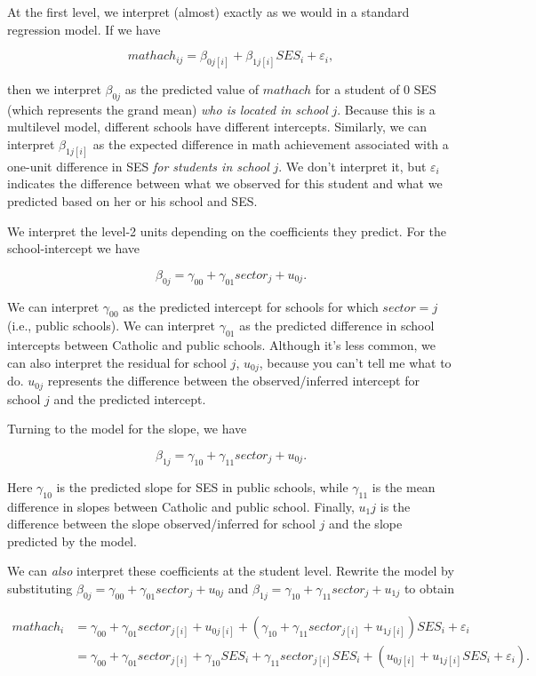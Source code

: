 \documentclass[
  letterpaper,
  DIV=11,
  numbers=noendperiod]{scrreprt}
\begin{document}
At the first level, we interpret (almost) exactly as we would in a
standard regression model. If we have

\[mathach_{ij} = \beta_{0j[i]} + \beta_{1j[i]}SES_i + \varepsilon_i,\]

then we interpret \(\beta_{0j}\) as the predicted value of \(mathach\)
for a student of 0 SES (which represents the grand mean) \emph{who is
located in school} \(j\). Because this is a multilevel model, different
schools have different intercepts. Similarly, we can interpret
\(\beta_{1j[i]}\) as the expected difference in math achievement
associated with a one-unit difference in SES \emph{for students in
school} \(j\). We don't interpret it, but \(\varepsilon_i\) indicates
the difference between what we observed for this student and what we
predicted based on her or his school and SES.

We interpret the level-2 units depending on the coefficients they
predict. For the school-intercept we have

\[\beta_{0j} = \gamma_{00} + \gamma_{01}sector_j + u_{0j}.\]

We can interpret \(\gamma_{00}\) as the predicted intercept for schools
for which \(sector = j\) (i.e., public schools). We can interpret
\(\gamma_{01}\) as the predicted difference in school intercepts between
Catholic and public schools. Although it's less common, we can also
interpret the residual for school \(j\), \(u_{0j}\), because you can't
tell me what to do. \(u_{0j}\) represents the difference between the
observed/inferred intercept for school \(j\) and the predicted
intercept.

Turning to the model for the slope, we have

\[\beta_{1j} = \gamma_{10} + \gamma_{11}sector_j + u_{0j}.\]

Here \(\gamma_{10}\) is the predicted slope for SES in public schools,
while \(\gamma_{11}\) is the mean difference in slopes between Catholic
and public school. Finally, \(u_1j\) is the difference between the slope
observed/inferred for school \(j\) and the slope predicted by the model.

We can \emph{also} interpret these coefficients at the student level.
Rewrite the model by substituting
\(\beta_{0j} = \gamma_{00} + \gamma_{01}sector_j + u_{0j}\) and
\(\beta_{1j} = \gamma_{10} + \gamma_{11}sector_j + u_{1j}\) to obtain

\[\begin{aligned}
mathach_i &= \gamma_{00} + \gamma_{01}sector_{j[i]} + u_{0j[i]} + (\gamma_{10} + \gamma_{11}sector_{j[i]} + u_{1j[i]})SES_i + \varepsilon_i \\
&= \gamma_{00} + \gamma_{01}sector_{j[i]} + \gamma_{10}SES_i + \gamma_{11}sector_{j[i]}SES_i + (u_{0j[i]} + u_{1j[i]}SES_i + \varepsilon_i).
\end{aligned}\]
\end{document}
